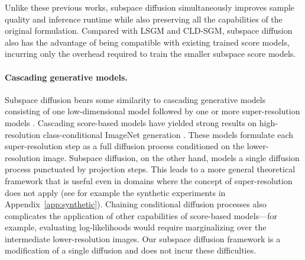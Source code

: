 \documentclass{article}
\begin{document}
Unlike these previous works, subspace diffusion simultaneously improves sample quality and inference runtime while also preserving all the capabilities of the original formulation. Compared with LSGM and CLD-SGM, subspace diffusion also has the advantage of being compatible with existing trained score models, incurring only the overhead required to train the smaller subspace score models.

\paragraph{\textbf{Cascading generative models.}} Subspace diffusion bears some similarity to cascading generative models consisting of one low-dimensional model followed by one or more super-resolution models \cite{menick2018generating,razavi2019generating}. Cascading score-based models have yielded strong results on high-resolution class-conditional ImageNet generation \cite{dhariwal2021diffusion,saharia2021image,ho2021cascaded}. These models formulate each super-resolution step as a full diffusion process conditioned on the lower-resolution image. Subspace diffusion, on the other hand, models a single diffusion process punctuated by projection steps. This leads to a more general theoretical framework that is useful even in domains where the concept of super-resolution does not apply (see for example the synthetic experiments in Appendix~\ref{app:synthetic}). Chaining conditional diffusion processes also complicates the application of other capabilities of score-based models---for example, evaluating log-likelihoods would require marginalizing over the intermediate lower-resolution images. Our subspace diffusion framework is a modification of a single diffusion and does not incur these difficulties.
\end{document}
